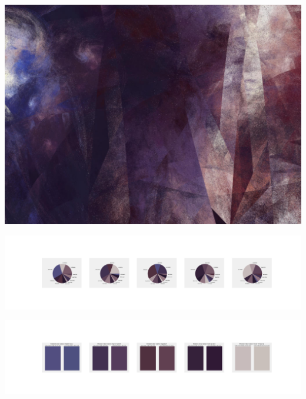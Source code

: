 \documentclass[11pt]{article}
\begin{document}
\begin{landscape}
    \begin{center}
    \includegraphics[width=\textwidth]{./nbimg/file (152).jpg}
    \end{center}

    \begin{center}
    \includegraphics[width=250mm]{./nbimg/pie-59.jpg}
    \end{center}

    \begin{center}
    \includegraphics[width=250mm]{./nbimg/peak-59.jpg}
    \end{center}
    


\end{landscape}
\end{document}
